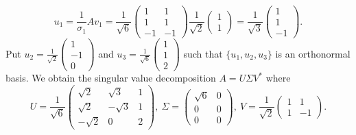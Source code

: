 \begin{Exercise}
\begin{enumerate}[(a)]
\begin{solution}
			$$
			u_1 = \frac{1}{\sigma_1}A v_1 = \frac{1}{\sqrt{6}} \begin{pmatrix}
			1 & 1 \\
			1 & 1 \\
			-1 & -1
			\end{pmatrix} \dfrac{1}{\sqrt{2}}\begin{pmatrix}
			1 \\
			1
			\end{pmatrix} = \frac{1}{\sqrt{3}}\begin{pmatrix}
			1 \\
			1 \\
			-1
			\end{pmatrix}.
			$$
			Put $u_2 = \frac{1}{\sqrt{2}}\begin{pmatrix}
			1 \\
			-1 \\
			0
			\end{pmatrix}$ and $u_3 = \frac{1}{\sqrt{6}}\begin{pmatrix}
			1 \\
			1 \\
			2
			\end{pmatrix}$ such that $\{u_1, u_2, u_3\}$ is an orthonormal basis.
			We obtain the singular value decomposition $A = U\Sigma V^*$ where
			$$
			U = \frac{1}{\sqrt{6}}\begin{pmatrix}
			\sqrt{2} & \sqrt{3} & 1 \\
			\sqrt{2} & -\sqrt{3} & 1 \\
			-\sqrt{2} & 0 & 2
			\end{pmatrix},~ \Sigma = \begin{pmatrix}
			\sqrt{6} & 0 \\
			0 & 0 \\
			0 & 0
			\end{pmatrix},~ V = \frac{1}{\sqrt{2}}\begin{pmatrix}
			1 & 1 \\
			1 & -1
			\end{pmatrix}.
			$$ 
		\end{solution}
	\end{enumerate}
\end{Exercise}